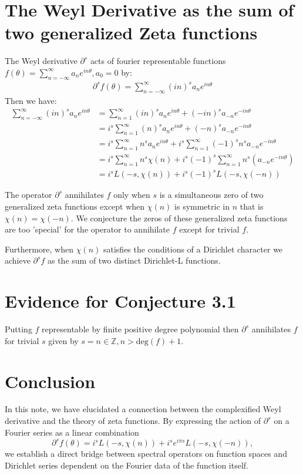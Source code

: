 \documentclass{artjlt}
\newcommand{\?}{\textbackslash}
\newcommand{\Z}{\mathbb{Z}}
\begin{document}
\section{The Weyl Derivative as the sum of two generalized Zeta functions}
The Weyl derivative $\partial^s$ \cite{article} acts of fourier representable functions 
$f(\theta)= \sum_{n=-\infty}^\infty a_n e^{i n \theta}, a_0 = 0$ by:
\begin{align*}
  \partial^s f(\theta)= \sum_{n=-\infty}^\infty (in)^s a_n e^{i n \theta}
\end{align*}
Then we have:
\begin{align*}
  \sum_{n=-\infty}^\infty (in)^s a_n e^{i n \theta} &= \sum_{n=1}^\infty (in)^s a_n e^{i n \theta} + (-in)^s a_{-n} e^{-i n \theta} \\
  &= i^s \sum_{n=1}^\infty (n)^s a_n e^{i n \theta} + (-n)^s a_{-n} e^{-i n \theta} \\
&= i^s \sum_{n=1}^\infty n^s a_n e^{in\theta} + i^s \sum_{n=1}^\infty (-1)^s n^s a_{-n} e^{-in \theta} \\
&= i^s \sum_{n=1}^\infty n^s \chi(n) + i^s (-1)^s \sum_{n=1}^\infty n^s (a_{-n} e^{-in\theta}) \\
&= i^s L(-s, \chi(n)) + i^s (-1)^s L(-s, \chi(-n))
\end{align*}
\begin{conjecture}
The operator $\partial^s$ annihilates $f$ only when $s$ is a simultaneous zero of two generalized zeta functions except when $\chi(n)$ is symmetric in $n$ that is $\chi(n) = \chi(-n)$. 
We conjecture the zeros of these generalized zeta functions are too 'special' for the operator to annihilate $f$ except for trivial $f$. 
\end{conjecture}
Furthermore, when $\chi(n)$ satisfies the conditions of a Dirichlet character we achieve $\partial^s f$ as the sum of two distinct Dirichlet-L functions. \cite{davenport2000}
\section{Evidence for Conjecture 3.1}
Putting $f$ representable by finite positive degree polynomial then $\partial^s$ annihilates $f$ for trivial $s$ given by $s = n \in \Z, n > \text{deg}(f) + 1$.
\section{Conclusion}

In this note, we have elucidated a connection between the complexified Weyl derivative and the theory of zeta functions. By expressing the action of $\partial^s$ on a Fourier series as a linear combination
\[
\partial^{s}f(\theta) = i^{s}L(-s, \chi(n)) + i^{s}e^{i\pi s}L(-s, \chi(-n)),
\]
we establish a direct bridge between spectral operators on function spaces and Dirichlet series dependent on the Fourier data of the function itself.
\end{document}
